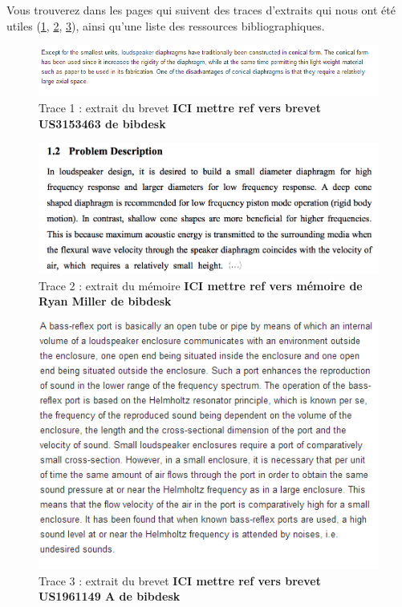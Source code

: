 Vous trouverez dans les pages qui suivent des traces d'extraits qui nous ont été utiles (\ref{Trace 1}, \ref{Trace 2}, \ref{Trace 3}), ainsi qu'une liste des ressources bibliographiques.

\begin{figure}
\begin{center}
\includegraphics[scale=0.8]{img/Trace1-brevet US 3153463.png}
\end{center}
\caption{Trace 1 : extrait du brevet \textbf{ICI mettre ref vers brevet US3153463 de bibdesk}} 
 \label{Trace 1}
\end{figure}

\begin{figure}
\begin{center}
\includegraphics[scale=0.35]{img/Trace2-Miller.png}
\end{center}
\caption{Trace 2 : extrait du mémoire \textbf{ICI mettre ref vers mémoire de Ryan Miller de bibdesk}} 
 \label{Trace 2}
\end{figure}

\begin{figure}
\begin{center}
\includegraphics{img/Trace 3-US 1961149 A.png}
\end{center}
\caption{Trace 3 : extrait du brevet \textbf{ICI mettre ref vers brevet US1961149 A de bibdesk}} 
 \label{Trace 3}
\end{figure}



\

\

 
 
 
 
 


